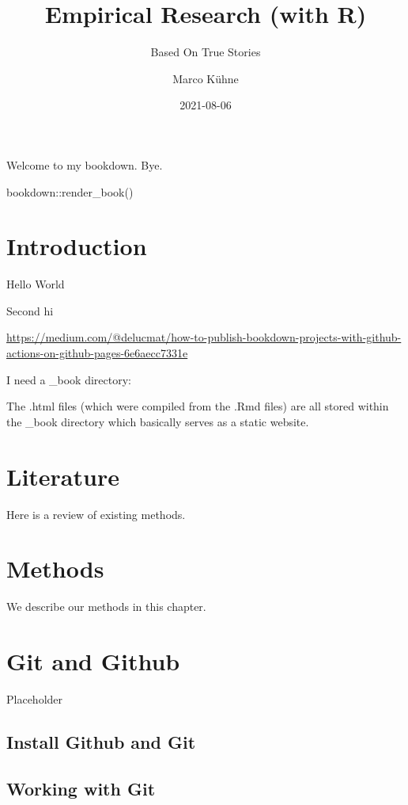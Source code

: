 \documentclass[
]{book}
\title{Empirical Research (with R)}
\subtitle{Based On True Stories}
\author{Marco Kühne}
\date{2021-08-06}
\begin{document}
\maketitle

{
\setcounter{tocdepth}{1}
\tableofcontents
}
Welcome to my bookdown. Bye.

bookdown::render\_book()

\hypertarget{introduction}{%
\chapter{Introduction}\label{introduction}}

Hello World

Second hi

\url{https://medium.com/@delucmat/how-to-publish-bookdown-projects-with-github-actions-on-github-pages-6e6aecc7331e}

I need a \_book directory:

The .html files (which were compiled from the .Rmd files) are all stored within the \_book directory which basically serves as a static website.

\hypertarget{literature}{%
\chapter{Literature}\label{literature}}

Here is a review of existing methods.

\hypertarget{methods}{%
\chapter{Methods}\label{methods}}

We describe our methods in this chapter.

\hypertarget{git-and-github}{%
\chapter{Git and Github}\label{git-and-github}}

Placeholder

\hypertarget{install-github-and-git}{%
\section{Install Github and Git}\label{install-github-and-git}}

\hypertarget{working-with-git}{%
\section{Working with Git}\label{working-with-git}}
\end{document}
